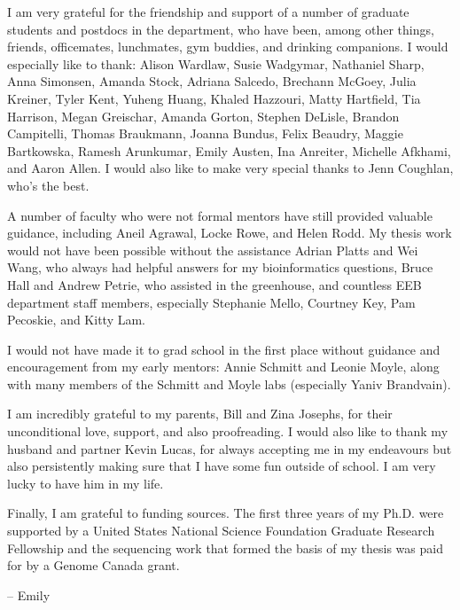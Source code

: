 \documentclass{ut-thesis}
\begin{document}
\begin{preliminary}
\begin{acknowledgements}
I am very grateful for the friendship and support of a number of graduate students and postdocs in the department, who have been, among other things, friends, officemates, lunchmates, gym buddies, and drinking companions. I would especially like to thank: Alison Wardlaw, Susie Wadgymar, Nathaniel Sharp, Anna Simonsen, Amanda Stock, Adriana Salcedo, Brechann McGoey, Julia Kreiner, Tyler Kent, Yuheng Huang, Khaled Hazzouri, Matty Hartfield, Tia Harrison, Megan Greischar, Amanda Gorton, Stephen DeLisle, Brandon Campitelli, Thomas Braukmann, Joanna Bundus, Felix Beaudry, Maggie Bartkowska, Ramesh Arunkumar, Emily Austen, Ina Anreiter, Michelle Afkhami, and Aaron Allen. I would also like to make very special thanks to Jenn Coughlan, who’s the best. 

A number of faculty who were not formal mentors have still provided valuable guidance, including Aneil Agrawal, Locke Rowe, and Helen Rodd. My thesis work would not have been possible without the assistance Adrian Platts and Wei Wang, who always had helpful answers for my bioinformatics questions, Bruce Hall and Andrew Petrie, who assisted in the greenhouse, and countless EEB department staff members, especially Stephanie Mello, Courtney Key, Pam Pecoskie, and Kitty Lam. 

I would not have made it to grad school in the first place without guidance and encouragement from my early mentors: Annie Schmitt and Leonie Moyle, along with many members of the Schmitt and Moyle labs (especially Yaniv Brandvain).

I am incredibly grateful to my parents, Bill and Zina Josephs, for their unconditional love, support, and also proofreading. I would also like to thank my husband and partner Kevin Lucas, for always accepting me in my endeavours but also persistently making sure that I have some fun outside of school. I am very lucky to have him in my life.

Finally, I am grateful to funding sources. The first three years of my Ph.D. were supported by a United States National Science Foundation Graduate Research Fellowship and the sequencing work that formed the basis of my thesis was paid for by a Genome Canada grant.

-- Emily

\end{acknowledgements}

\tableofcontents

\listoftables

\listoffigures


\end{preliminary}
\end{document}
